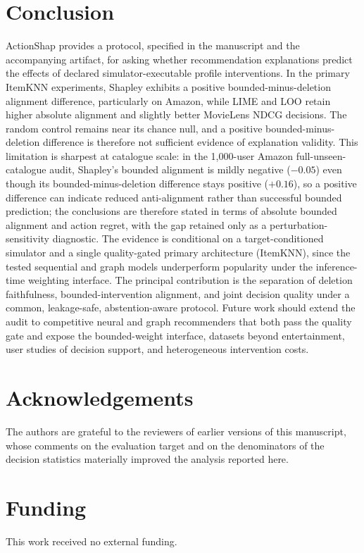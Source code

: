 \documentclass[manuscript,screen,review,anonymous]{acmart}
\begin{document}
\section{Conclusion}
ActionShap provides a protocol, specified in the manuscript and the accompanying artifact, for asking whether recommendation explanations predict the effects of declared simulator-executable profile interventions. In the primary ItemKNN experiments, Shapley exhibits a positive bounded-minus-deletion alignment difference, particularly on Amazon, while LIME and LOO retain higher absolute alignment and slightly better MovieLens NDCG decisions. The random control remains near its chance null, and a positive bounded-minus-deletion difference is therefore not sufficient evidence of explanation validity. This limitation is sharpest at catalogue scale: in the 1,000-user Amazon full-unseen-catalogue audit, Shapley's bounded alignment is mildly negative ($-0.05$) even though its bounded-minus-deletion difference stays positive ($+0.16$), so a positive difference can indicate reduced anti-alignment rather than successful bounded prediction; the conclusions are therefore stated in terms of absolute bounded alignment and action regret, with the gap retained only as a perturbation-sensitivity diagnostic. The evidence is conditional on a target-conditioned simulator and a single quality-gated primary architecture (ItemKNN), since the tested sequential and graph models underperform popularity under the inference-time weighting interface. The principal contribution is the separation of deletion faithfulness, bounded-intervention alignment, and joint decision quality under a common, leakage-safe, abstention-aware protocol. Future work should extend the audit to competitive neural and graph recommenders that both pass the quality gate and expose the bounded-weight interface, datasets beyond entertainment, user studies of decision support, and heterogeneous intervention costs.



\section{Acknowledgements}
The authors are grateful to the reviewers of earlier versions of this manuscript, whose comments on the
evaluation target and on the denominators of the decision statistics materially improved the analysis
reported here.

\section{Funding}
This work received no external funding.
\end{document}
